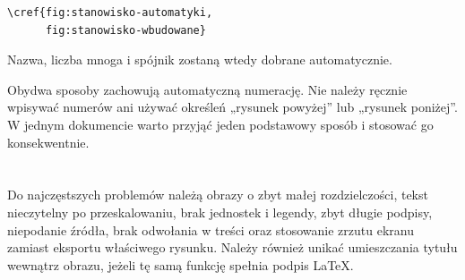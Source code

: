 \begin{lstlisting}[numbers=none]
\cref{fig:stanowisko-automatyki,
      fig:stanowisko-wbudowane}
\end{lstlisting}

Nazwa, liczba mnoga i spójnik zostaną wtedy dobrane automatycznie.

Obydwa sposoby zachowują automatyczną numerację. Nie należy ręcznie wpisywać numerów ani używać określeń „rysunek powyżej” lub „rysunek poniżej”. W jednym dokumencie warto przyjąć jeden podstawowy sposób i stosować go konsekwentnie.

\section{}

Do najczęstszych problemów należą obrazy o zbyt małej rozdzielczości, tekst nieczytelny po przeskalowaniu, brak jednostek i legendy, zbyt długie podpisy, niepodanie źródła, brak odwołania w treści oraz stosowanie zrzutu ekranu zamiast eksportu właściwego rysunku. Należy również unikać umieszczania tytułu wewnątrz obrazu, jeżeli tę samą funkcję spełnia podpis LaTeX.
